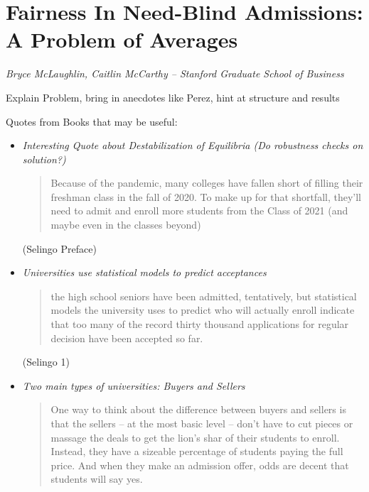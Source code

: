 \documentclass[10pt]{article}
\begin{document}
\section*{Fairness In Need-Blind Admissions: A Problem of Averages}

\textit{Bryce McLaughlin, Caitlin McCarthy -- Stanford Graduate School of Business}

\medskip

{\color{red} Explain Problem, bring in anecdotes like Perez, hint at structure and results}

{\color{blue} Quotes from Books that may be useful:

\begin{itemize}
	\item \textit{Interesting Quote about Destabilization of Equilibria (Do robustness checks on solution?)} 
	\begin{quote} Because of the pandemic, many colleges have fallen short of filling their freshman class in the fall of 2020. To make up for that shortfall, they'll need to admit and enroll more students from the Class of 2021 (and maybe even in the classes beyond)
	\end{quote} (Selingo Preface)
	\item \textit{Universities use statistical models to predict acceptances}
	\begin{quote}
	the high school seniors have been admitted, tentatively, but statistical models the university uses to predict who will actually enroll indicate that too many of the record thirty thousand applications for regular decision have been accepted so far.
	\end{quote}
	(Selingo 1)
	\item \textit{Two main types of universities: Buyers and Sellers}
	\begin{quote}
	One way to think about the difference between buyers and sellers is that the sellers -- at the most basic level -- don't have to cut pieces or massage the deals to get the lion's shar of their students to enroll. Instead, they have a sizeable percentage of students paying the full price. And when they make an admission offer, odds are decent that students will say yes.


\end{quote}
\end{itemize}}
\end{document}
